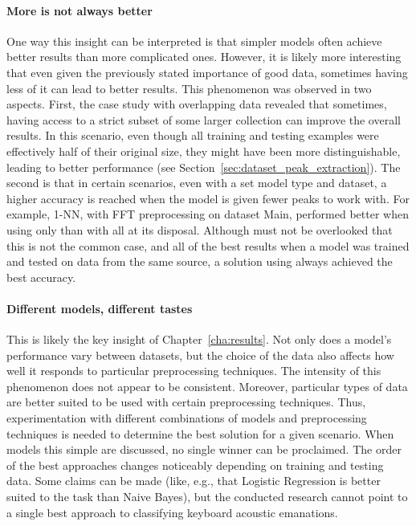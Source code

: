 \documentclass[../main.tex]{subfiles}
\begin{document}
\paragraph{More is not always better} 
One way this insight can be interpreted is that simpler models often achieve better results than more complicated ones.
However, it is likely more interesting that even given the previously stated importance of good data, sometimes having 
less of it can lead to better results. This phenomenon was observed in two aspects.
First, the case study with overlapping data revealed that sometimes, having access to a strict subset of some larger collection can improve the overall results. In this scenario, even though all training and testing
examples were effectively half of their original size, they might have been more distinguishable, leading to better performance (see Section~\ref{sec:dataset_peak_extraction}).
The second is that in certain scenarios, even with a set model type and dataset, a higher accuracy is reached when the model
is given fewer peaks to work with. For example, 1-NN, with FFT preprocessing on dataset Main, performed better when 
using only  than with all  at its disposal.
Although must not be overlooked that this is not the common case, and all of the best results when a model was trained and
tested on data from the same source, a solution using  always achieved the best accuracy.

\paragraph{Different models, different tastes}
This is likely the key insight of Chapter~\ref{cha:results}. Not only does a model's performance vary between datasets,
but the choice of the data also affects how well it responds to particular preprocessing techniques.
The intensity of this phenomenon does not appear to be consistent.
Moreover, particular types of data are better suited to be used with certain preprocessing techniques.
Thus, experimentation with different 
combinations of models and preprocessing techniques is needed to determine the best solution for a given scenario.
When models this simple are discussed, no single winner can be proclaimed. The order of the best approaches
changes noticeably depending on training and testing data. Some claims can be made (like, e.g., that Logistic
Regression is better suited to the task than Naive Bayes), but the conducted research cannot point to a single best
approach to classifying keyboard acoustic emanations.
\end{document}
